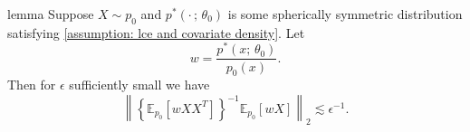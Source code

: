 \documentclass[11pt]{article}
\begin{document}


\begin{restatable}{lemma}{} \label{lemma: pnorm bound} Suppose $X\sim p_0$ and $p^*(\cdot\,;\, \theta_0)$ is some spherically symmetric distribution satisfying \cref{assumption: lce and covariate density}. Let
\[w =  \frac{p^*(x;\,\theta_0)}{p_0(x)}.\]
Then for $\epsilon$ sufficiently small we have
\begin{equation}
   \left\|\left\{\mathbb{E}_{p_{0}}[wXX^{T}]\right\}^{-1}\mathbb{E}_{p_{0}}[wX]\right\|_2 \lesssim \epsilon^{-1}.
\end{equation}
\end{restatable}
\end{document}
